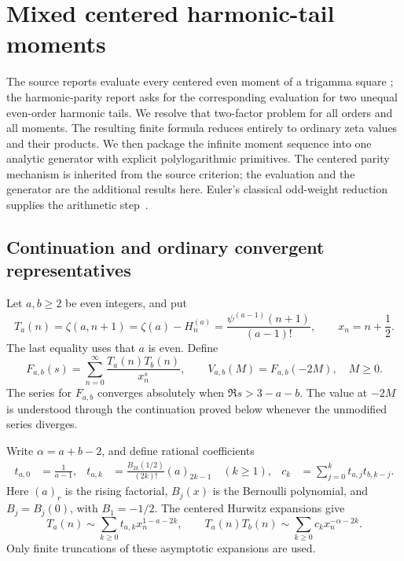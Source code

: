 \documentclass[11pt,letterpaper]{article}
\numberwithin{equation}{section}
\theoremstyle{plain}
\theoremstyle{definition}
\theoremstyle{remark}
\begin{document}
\section{Mixed centered harmonic-tail moments}
\label{mt:section}

The source reports evaluate every centered even moment of a trigamma
square \cite{IncomingHigherReflection,IncomingParity}; the harmonic-parity
report asks for the corresponding evaluation for two unequal even-order
harmonic tails. We resolve that two-factor problem for all
orders and all moments. The resulting finite formula reduces entirely to
ordinary zeta values and their products. We then package the infinite
moment sequence into one analytic generator with explicit
polylogarithmic primitives. The centered parity mechanism is inherited
from the source criterion; the evaluation and the generator are the
additional results here. Euler's classical odd-weight reduction supplies
the arithmetic step~\cite{Bradley2007}.

\subsection{Continuation and ordinary convergent representatives}

Let $a,b\ge2$ be even integers, and put
\begin{equation}\label{mt:notation}
 T_a(n)=\zeta(a,n+1)=\zeta(a)-H_n^{(a)}
       =\frac{\psi^{(a-1)}(n+1)}{(a-1)!},
 \qquad x_n=n+\frac12.
\end{equation}
The last equality uses that $a$ is even. Define
\begin{equation}\label{mt:F}
 F_{a,b}(s)=\sum_{n=0}^{\infty}\frac{T_a(n)T_b(n)}{x_n^s},
 \qquad V_{a,b}(M)=F_{a,b}(-2M),\quad M\ge0.
\end{equation}
The series for $F_{a,b}$ converges absolutely when
$\Re s>3-a-b$. The value at $-2M$ is understood through the continuation
proved below whenever the unmodified series diverges.

Write $\alpha=a+b-2$, and define rational coefficients
\begin{align}
 t_{a,0}&=\frac1{a-1},&
 t_{a,k}&=\frac{B_{2k}(1/2)}{(2k)!}(a)_{2k-1}\quad(k\ge1),
 &c_k&=\sum_{j=0}^k t_{a,j}t_{b,k-j}.
 \label{mt:centered-coefficients}
\end{align}
Here $(a)_r$ is the rising factorial, $B_j(x)$ is the Bernoulli
polynomial, and $B_j=B_j(0)$, with $B_1=-1/2$.
The centered Hurwitz expansions \cite[\S25.11(xii)]{DLMFHurwitz} give
\begin{equation}\label{mt:centered-expansion}
 T_a(n)\sim\sum_{k\ge0}t_{a,k}x_n^{1-a-2k},
 \qquad
 T_a(n)T_b(n)\sim\sum_{k\ge0}c_kx_n^{-\alpha-2k}.
\end{equation}
Only finite truncations of these asymptotic expansions are used.
\end{document}
